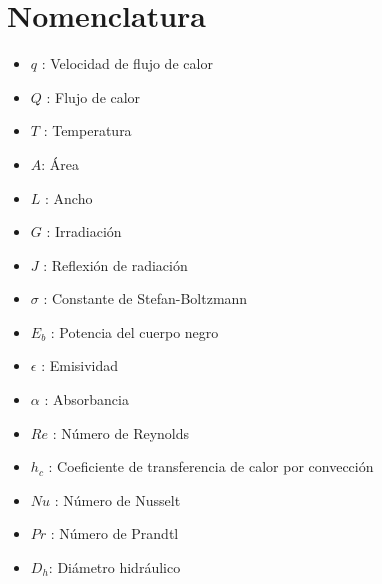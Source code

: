 \documentclass[12pt,letterpaper]{article}     %
\begin{document}
\newpage
\let\OLDthebibliography=\thebibliography
\def\thebibliography#1{\OLDthebibliography{#1}%
\addcontentsline{toc}{section}{\refname}}


\makeatletter
\renewcommand\@biblabel[1]{#1. \ }
\makeatother



\setcounter{page}{1}
\tableofcontents

\newpage

\listoffigures
\newpage
\listoftables

\newpage

\section*{Nomenclatura}

\begin{itemize}
\item ${ q }$ : Velocidad de flujo de calor
\item $Q$ : Flujo de calor
\item $T$ : Temperatura
\item $A$: Área
\item $L$ : Ancho
\item $G$ : Irradiación
\item $J$ : Reflexión de radiación
\item ${  \sigma }$ :  Constante de Stefan-Boltzmann
\item ${ E }_{ b }$ : Potencia del cuerpo negro
\item $\epsilon$ : Emisividad
\item $\alpha$ : Absorbancia
\item ${ Re }$ : Número de Reynolds
\item ${ h }_{ c }$ : Coeficiente de transferencia de calor por convección
\item ${Nu }$ : Número de Nusselt
\item $Pr$ : Número de Prandtl
\item ${ D}_{h }$: Diámetro hidráulico
\end{itemize}
%
\newpage
%
\setcounter{page}{1}

\end{document}
